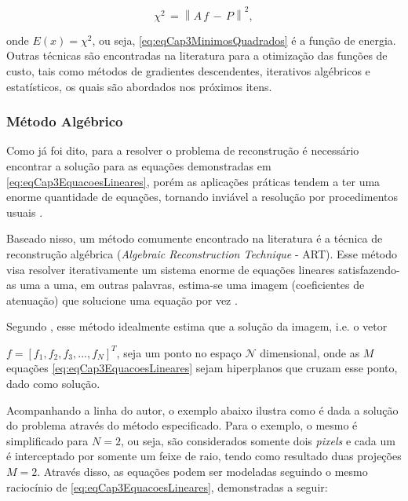 {\begin{equation}
\chi^{2} \, = \left\| A \, f \, - \,P \right\|^{2},
\label{eq:eqCap3MinimosQuadrados}
\end{equation} 

\noindent onde $E(x) = \chi^{2}$, ou seja, \eqref{eq:eqCap3MinimosQuadrados} é a função de energia. Outras técnicas são encontradas na literatura para a otimização das funções de custo, tais como métodos de gradientes descendentes, iterativos algébricos e estatísticos, os quais são abordados nos próximos itens.


\subsubsection{Método Algébrico}

Como já foi dito, para a resolver o problema de reconstrução é necessário encontrar a solução para as equações demonstradas em \eqref{eq:eqCap3EquacoesLineares}, porém as aplicações práticas tendem a ter uma enorme quantidade de equações, tornando inviável a resolução por procedimentos usuais \cite[p. 210]{buzug2008computed}. 

Baseado nisso, um método comumente encontrado na literatura é a técnica de reconstrução algébrica (\textit{Algebraic Reconstruction Technique} - \acs{ART}). Esse método visa resolver iterativamente um sistema enorme de equações lineares satisfazendo-as uma a uma, em outras palavras, estima-se uma imagem (coeficientes de atenuação) que solucione uma equação por vez \cite{rangayyan2004biomedical}. 

Segundo , esse método idealmente estima que a solução da imagem, i.e. o vetor {$f = [f_{1},f_{2},f_{3},...,f_{N}]^{T}$, seja um ponto no espaço $\mathcal{N}$ dimensional, onde as $M$ equações \eqref{eq:eqCap3EquacoesLineares} sejam hiperplanos que cruzam esse ponto, dado como solução.

Acompanhando a linha do autor, o exemplo abaixo ilustra como é dada a solução do problema através do método especificado. Para o exemplo, o mesmo é simplificado para $N = 2$, ou seja, são considerados somente dois \textit{pixels} e cada um é interceptado por somente um feixe de raio, tendo como resultado duas projeções $M=2$. Através disso, as equações podem ser modeladas seguindo o mesmo raciocínio de \eqref{eq:eqCap3EquacoesLineares}, demonstradas a seguir:

}}
